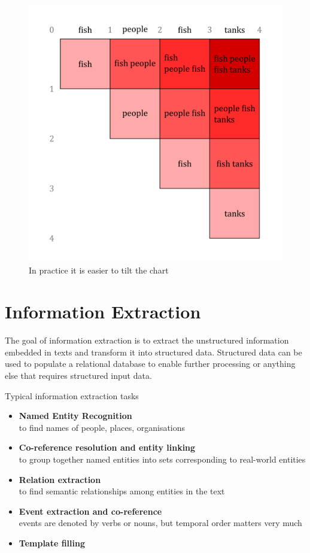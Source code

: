 \documentclass[11pt]{article}
\begin{document}
\begin{figure}[H]
	\centering
	\includegraphics[width=0.6\linewidth]{img/cky_constituency_parsing_graph_example}
	\caption{In practice it is easier to tilt the chart}
\end{figure}

\section{Information Extraction}
The goal of information extraction is to extract the unstructured information embedded in texts and transform it into structured data. Structured data can be used to populate a relational database to enable further processing or anything else that requires structured input data.

Typical information extraction tasks
\begin{itemize}
	\item \textbf{Named Entity Recognition}\\
	to find names of people, places, organisations
	\item \textbf{Co-reference resolution and entity linking}\\
	to group together named entities into sets corresponding to real-world entities
	\item \textbf{Relation extraction}\\
	to find semantic relationships among entities in the text
	\item \textbf{Event extraction and co-reference}\\
	events are denoted by verbs or nouns, but temporal order matters very much
	\item \textbf{Template filling}
\end{itemize}
\end{document}
